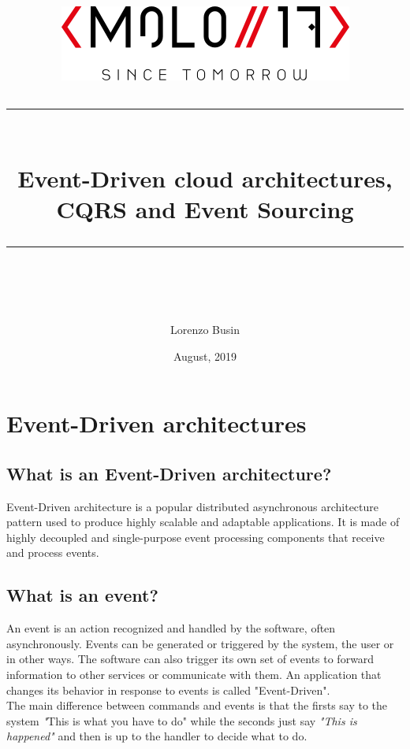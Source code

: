 \documentclass[11pt]{article} %
\title{	
	\normalfont\normalsize
	\includegraphics[width=0.5\columnwidth]{logo-black}
	\vspace{25pt} %
	\rule{\linewidth}{0.5pt}\\ %
	\vspace{20pt} %
	{\huge Event-Driven cloud architectures, CQRS and Event Sourcing}\\ %
	\vspace{12pt} %
	\rule{\linewidth}{2pt}\\ %
	\vspace{12pt} %
}
\author{\LARGE Lorenzo Busin} %
\date{\normalsize August, 2019} %
\begin{document}
\maketitle %


\tableofcontents
\newpage

\section{Event-Driven architectures}  

\subsection{What is an Event-Driven architecture?}
Event-Driven architecture is a popular distributed asynchronous architecture pattern used to produce highly scalable and adaptable applications. It is made of highly decoupled and single-purpose event processing components that receive and process events. 

\subsection{What is an event?}
An event is an action recognized and handled by the software, often asynchronously. Events can be generated or triggered by the system, the user or in other ways. The software can also trigger its own set of events to forward information to other services or communicate with them. An application that changes its behavior in response to events is called "Event-Driven".\\
The main difference between commands and events is that the firsts say to the system \emph"This is what you have to do" while the seconds just say \emph{"This is happened"} and then is up to the handler to decide what to do.
\end{document}
